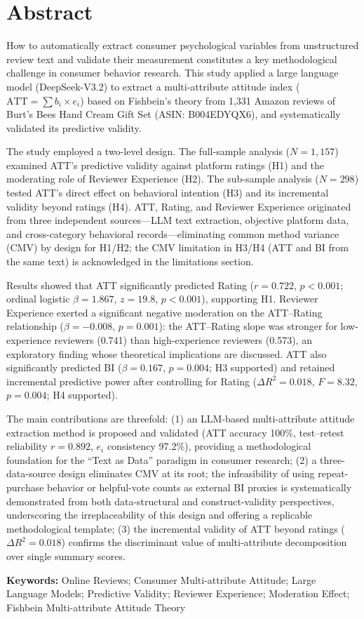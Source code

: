 \section*{Abstract}

{

How to automatically extract consumer psychological variables from unstructured review text and validate their measurement constitutes a key methodological challenge in consumer behavior research. This study applied a large language model (DeepSeek-V3.2) to extract a multi-attribute attitude index ($\text{ATT} = \sum b_i \times e_i$) based on Fishbein's theory from 1,331 Amazon reviews of Burt's Bees Hand Cream Gift Set (ASIN: B004EDYQX6), and systematically validated its predictive validity.

The study employed a two-level design. The full-sample analysis ($N=1{,}157$) examined ATT's predictive validity against platform ratings (H1) and the moderating role of Reviewer Experience (H2). The sub-sample analysis ($N=298$) tested ATT's direct effect on behavioral intention (H3) and its incremental validity beyond ratings (H4). ATT, Rating, and Reviewer Experience originated from three independent sources---LLM text extraction, objective platform data, and cross-category behavioral records---eliminating common method variance (CMV) by design for H1/H2; the CMV limitation in H3/H4 (ATT and BI from the same text) is acknowledged in the limitations section.

Results showed that ATT significantly predicted Rating ($r=0.722$, $p<0.001$; ordinal logistic $\beta=1.867$, $z=19.8$, $p<0.001$), supporting H1. Reviewer Experience exerted a significant negative moderation on the ATT--Rating relationship ($\beta=-0.008$, $p=0.001$): the ATT--Rating slope was stronger for low-experience reviewers (0.741) than high-experience reviewers (0.573), an exploratory finding whose theoretical implications are discussed. ATT also significantly predicted BI ($\beta=0.167$, $p=0.004$; H3 supported) and retained incremental predictive power after controlling for Rating ($\Delta R^2=0.018$, $F=8.32$, $p=0.004$; H4 supported).

The main contributions are threefold: (1) an LLM-based multi-attribute attitude extraction method is proposed and validated (ATT accuracy 100\%, test--retest reliability $r=0.892$, $e_i$ consistency 97.2\%), providing a methodological foundation for the ``Text as Data'' paradigm in consumer research; (2) a three-data-source design eliminates CMV at its root; the infeasibility of using repeat-purchase behavior or helpful-vote counts as external BI proxies is systematically demonstrated from both data-structural and construct-validity perspectives, underscoring the irreplaceability of this design and offering a replicable methodological template; (3) the incremental validity of ATT beyond ratings ($\Delta R^2=0.018$) confirms the discriminant value of multi-attribute decomposition over single summary scores.

\vspace{1em}
\noindent\textbf{Keywords:} Online Reviews; Consumer Multi-attribute Attitude; Large Language Models; Predictive Validity; Reviewer Experience; Moderation Effect; Fishbein Multi-attribute Attitude Theory
}
